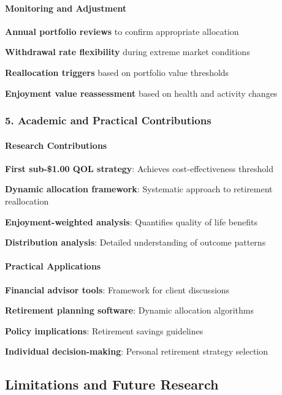 \documentclass[11pt,letterpaper]{article}
\begin{document}
{{{{{{{{{{{\paragraph{Monitoring and Adjustment}

\item \textbf{Annual portfolio reviews} to confirm appropriate allocation
\item \textbf{Withdrawal rate flexibility} during extreme market conditions
\item \textbf{Reallocation triggers} based on portfolio value thresholds
\item \textbf{Enjoyment value reassessment} based on health and activity changes

\subsubsection{5. Academic and Practical Contributions}


\paragraph{Research Contributions}

\item \textbf{First sub-\$1.00 QOL strategy}: Achieves cost-effectiveness threshold
\item \textbf{Dynamic allocation framework}: Systematic approach to retirement reallocation
\item \textbf{Enjoyment-weighted analysis}: Quantifies quality of life benefits
\item \textbf{Distribution analysis}: Detailed understanding of outcome patterns

\paragraph{Practical Applications}

\item \textbf{Financial advisor tools}: Framework for client discussions
\item \textbf{Retirement planning software}: Dynamic allocation algorithms
\item \textbf{Policy implications}: Retirement savings guidelines
\item \textbf{Individual decision-making}: Personal retirement strategy selection



\subsection{Limitations and Future Research}


}}}}}}}}}}}
\end{document}
